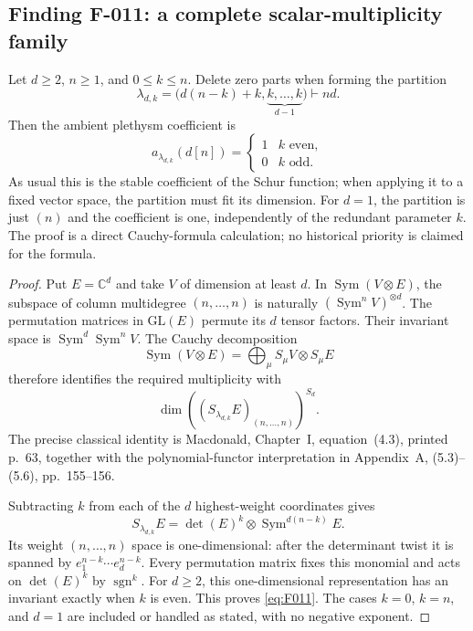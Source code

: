 \subsection*{Finding F-011: a complete scalar-multiplicity family}
Let \(d\geq2\), \(n\geq1\), and \(0\leq k\leq n\). Delete zero
parts when forming the partition
\[
 \lambda_{d,k}=
       \bigl(d(n-k)+k,\underbrace{k,\ldots,k}_{d-1}\bigr)
                  \vdash nd.
\]
Then the ambient plethysm coefficient is
\begin{equation}\label{eq:F011}
 a_{\lambda_{d,k}}(d[n])=
 \begin{cases}1&k\text{ even},\\0&k\text{ odd}.
 \end{cases}
\end{equation}
As usual this is the stable coefficient of the Schur function;
when applying it to a fixed vector space, the partition must fit
its dimension. For \(d=1\), the partition is just \((n)\) and the
coefficient is one, independently of the redundant parameter \(k\).
The proof is a direct Cauchy-formula calculation; no historical
priority is claimed for the formula.

\begin{proof}
Put \(E=\mathbb C^d\) and take \(V\) of dimension at least \(d\).
In \(\operatorname{Sym}(V\otimes E)\), the subspace of column
multidegree \((n,\ldots,n)\) is naturally
\((\operatorname{Sym}^n V)^{\otimes d}\).
The permutation matrices in \(\mathrm{GL}(E)\) permute its
\(d\) tensor factors. Their invariant space is
\(\operatorname{Sym}^d\operatorname{Sym}^n V\).
The Cauchy decomposition
\[
 \operatorname{Sym}(V\otimes E)
      =\bigoplus_\mu S_\mu V\otimes S_\mu E
\]
therefore identifies the required multiplicity with
\[
 \dim\left((S_{\lambda_{d,k}}E)_{(n,\ldots,n)}\right)^{S_d}.
\]
The precise classical identity is Macdonald, Chapter~I,
equation~(4.3), printed p.~63, together with the polynomial-functor
interpretation in Appendix~A, (5.3)--(5.6), pp.~155--156.

Subtracting \(k\) from each of the \(d\) highest-weight coordinates
gives
\[
 S_{\lambda_{d,k}}E
       =\det(E)^k\otimes\operatorname{Sym}^{d(n-k)}E.
\]
Its weight \((n,\ldots,n)\) space is one-dimensional:
after the determinant twist it is spanned by
\(e_1^{n-k}\cdots e_d^{n-k}\).
Every permutation matrix fixes this monomial and acts on
\(\det(E)^k\) by \(\operatorname{sgn}^k\).
For \(d\geq2\), this one-dimensional representation has an
invariant exactly when \(k\) is even. This proves \eqref{eq:F011}.
The cases \(k=0\), \(k=n\), and \(d=1\) are included or handled
as stated, with no negative exponent.
\end{proof}

